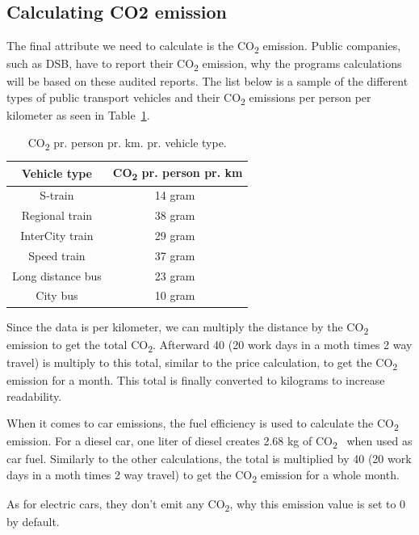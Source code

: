 \subsection{Calculating CO2 emission}\label{subsec:calculating-co2-emission}

The final attribute we need to calculate is the \unit{CO_{2}} emission.
Public companies, such as DSB, have to report their \unit{CO_{2}} emission, why the programs calculations will be based
on these audited reports.
The list below is a sample of the different types of public transport vehicles and their \unit{CO_{2}} emissions per
person per kilometer as seen in Table~\ref{tab:emissions}.

\begin{table}[H]
    \centering
    \begin{tabular}{ || c | c || }
        \hline
        Vehicle type & \unit{CO_{2}} pr. person pr. km \\
        \hline\hline
        S-train & 14 gram~\cite{dsb2023} \\
        \hline
        Regional train & 38 gram~\cite{dsb2023} \\
        \hline
        InterCity train & 29 gram~\cite{dsb2023} \\
        \hline
        Speed train & 37 gram~\cite{dsb2023} \\
        \hline
        Long distance bus & 23 gram~\cite{cowi2022} \\
        \hline
        City bus & 10 gram~\cite{ntm2023} \\
        \hline
    \end{tabular}
    \caption{\unit{CO_{2}} pr. person pr. km. pr. vehicle type.}
    \label{tab:emissions}
\end{table}

Since the data is per kilometer, we can multiply the distance by the \unit{CO_{2}} emission to get the total
\unit{CO_{2}}.
Afterward 40 (20 work days in a moth times 2 way travel) is multiply to this total, similar to the price calculation, to get the
\unit{CO_{2}} emission for a month.
This total is finally converted to kilograms to increase readability.

When it comes to car emissions, the fuel efficiency is used to calculate the \unit{CO_{2}} emission.
For a diesel car, one liter of diesel creates 2.68 kg of \unit{CO_{2}}~\cite{co2_car} when used as car fuel.
Similarly to the other calculations, the total is multiplied by 40 (20 work days in a moth times 2 way travel) to get
the \unit{CO_{2}} emission for a whole month.

As for electric cars, they don't emit any \unit{CO_{2}}, why this emission value is set to 0 by default.
